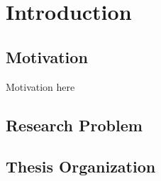 \chapter{Introduction}
\label{ch:background}

\section{Motivation} \label{intro:motivation}
Motivation here

\section{Research Problem} \label{intro:research}

\section{Thesis Organization} \label{intro:organization}